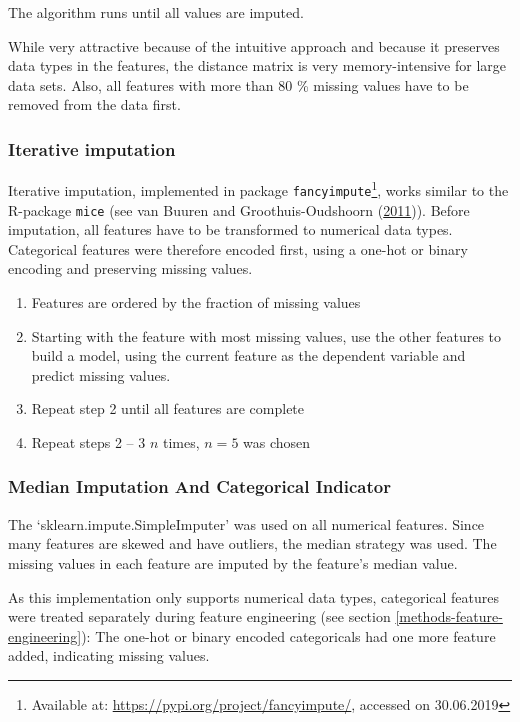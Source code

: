 \documentclass[
  11pt,
  a4paper,
  DIV=12,captions=tableheading,oneside,titlepage=firstiscover,abstracton]{scrreprt}
\providecommand{\tightlist}{%
  \setlength{\itemsep}{0pt}\setlength{\parskip}{0pt}}
\providecommand{\tightlist}{%
  \setlength{\itemsep}{0pt}\setlength{\parskip}{0pt}}
\begin{document}
The algorithm runs until all values are imputed.

While very attractive because of the intuitive approach and because it preserves data types in the features, the distance matrix is very memory-intensive for large data sets. Also, all features with more than 80 \% missing values have to be removed from the data first.

\hypertarget{iterative-imputation}{%
\subsubsection{Iterative imputation}\label{iterative-imputation}}

Iterative imputation, implemented in package \texttt{fancyimpute}\footnote{Available at: \url{https://pypi.org/project/fancyimpute/}, accessed on 30.06.2019}, works similar to the R-package \texttt{mice} (see van Buuren and Groothuis-Oudshoorn (\protect\hyperlink{ref-buuren2011mice}{2011})). Before imputation, all features have to be transformed to numerical data types. Categorical features were therefore encoded first, using a one-hot or binary encoding and preserving missing values.

\begin{enumerate}
\def\labelenumi{\arabic{enumi}.}
\tightlist
\item
  Features are ordered by the fraction of missing values
\item
  Starting with the feature with most missing values, use the other features to build a model, using the current feature as the dependent variable and predict missing values.
\item
  Repeat step 2 until all features are complete
\item
  Repeat steps 2 -- 3 \(n\) times, \(n=5\) was chosen
\end{enumerate}

\hypertarget{median-imputation-and-categorical-indicator}{%
\subsubsection{Median Imputation And Categorical Indicator}\label{median-imputation-and-categorical-indicator}}

The `sklearn.impute.SimpleImputer' was used on all numerical features. Since many features are skewed and have outliers, the median strategy was used. The missing values in each feature are imputed by the feature's median value.

As this implementation only supports numerical data types, categorical features were treated separately during feature engineering (see section \ref{methods-feature-engineering}): The one-hot or binary encoded categoricals had one more feature added, indicating missing values.
\end{document}
